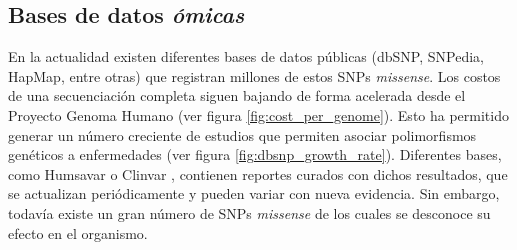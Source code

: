 \subsection{Bases de datos \textit{ómicas}}

En la actualidad existen diferentes bases de datos públicas (dbSNP, SNPedia, HapMap, entre otras) que registran millones de estos SNPs \textit{missense}. Los costos de una secuenciación completa siguen bajando de forma acelerada desde el Proyecto Genoma Humano \cite{sequencingcost} (ver figura \ref{fig:cost_per_genome}). Esto ha permitido generar un número creciente de estudios que permiten asociar polimorfismos genéticos a enfermedades (ver figura \ref{fig:dbsnp_growth_rate}). Diferentes bases, como Humsavar \cite{humsavar} o Clinvar \cite{clinvar}, contienen reportes curados con dichos resultados, que se actualizan periódicamente y pueden variar con nueva evidencia. Sin embargo, todavía existe un gran número de SNPs \textit{missense} de los cuales se desconoce su efecto en el organismo. 

